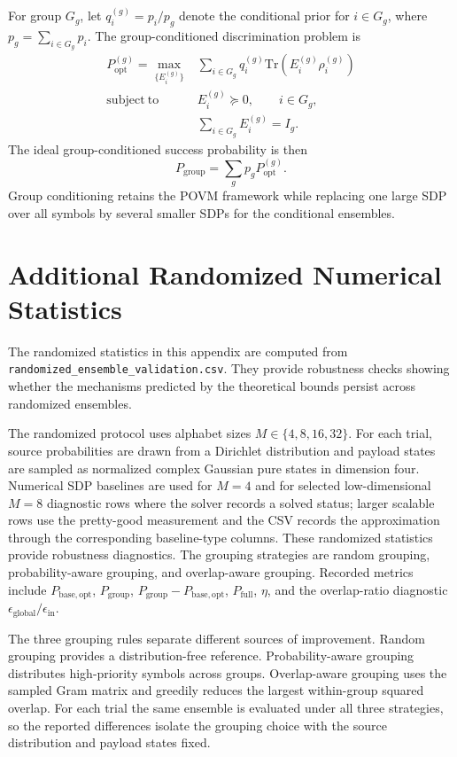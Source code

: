 \documentclass[
 reprint,
 amsmath,amssymb,
 aps,
 pra,
 floatfix,
]{revtex4-2}
\begin{document}
For group $G_g$, let $q_i^{(g)}=p_i/p_g$ denote the conditional prior for $i\in G_g$, where $p_g=\sum_{i\in G_g}p_i$. The group-conditioned discrimination problem is
\begin{align}
    P_{\mathrm{opt}}^{(g)}
    =
    \max_{\{E_i^{(g)}\}}
    &\sum_{i\in G_g}q_i^{(g)}
    \mathrm{Tr}\left(E_i^{(g)}\rho_i^{(g)}\right)
    \label{eq:appendix_group_sdp}\\
    \mathrm{subject\ to}\quad
    &E_i^{(g)}\succeq0,\qquad i\in G_g,\nonumber\\
    &\sum_{i\in G_g}E_i^{(g)}=I_g.\nonumber
\end{align}
The ideal group-conditioned success probability is then
\begin{equation}
    P_{\mathrm{group}}=\sum_gp_gP_{\mathrm{opt}}^{(g)}.
\end{equation}
Group conditioning retains the POVM framework while replacing one large SDP over all symbols by several smaller SDPs for the conditional ensembles.

\FloatBarrier
\section{Additional Randomized Numerical Statistics}

The randomized statistics in this appendix are computed from \texttt{randomized\_ensemble\_validation.csv}. They provide robustness checks showing whether the mechanisms predicted by the theoretical bounds persist across randomized ensembles.

The randomized protocol uses alphabet sizes \(M\in\{4,8,16,32\}\). For each trial, source probabilities are drawn from a Dirichlet distribution and payload states are sampled as normalized complex Gaussian pure states in dimension four. Numerical SDP baselines are used for \(M=4\) and for selected low-dimensional \(M=8\) diagnostic rows where the solver records a solved status; larger scalable rows use the pretty-good measurement and the CSV records the approximation through the corresponding baseline-type columns. These randomized statistics provide robustness diagnostics. The grouping strategies are random grouping, probability-aware grouping, and overlap-aware grouping. Recorded metrics include \(P_{\mathrm{base,opt}}\), \(P_{\mathrm{group}}\), \(P_{\mathrm{group}}-P_{\mathrm{base,opt}}\), \(P_{\mathrm{full}}\), \(\eta\), and the overlap-ratio diagnostic \(\epsilon_{\mathrm{global}}/\epsilon_{\mathrm{in}}\).

The three grouping rules separate different sources of improvement. Random grouping provides a distribution-free reference. Probability-aware grouping distributes high-priority symbols across groups. Overlap-aware grouping uses the sampled Gram matrix and greedily reduces the largest within-group squared overlap. For each trial the same ensemble is evaluated under all three strategies, so the reported differences isolate the grouping choice with the source distribution and payload states fixed.
\end{document}
